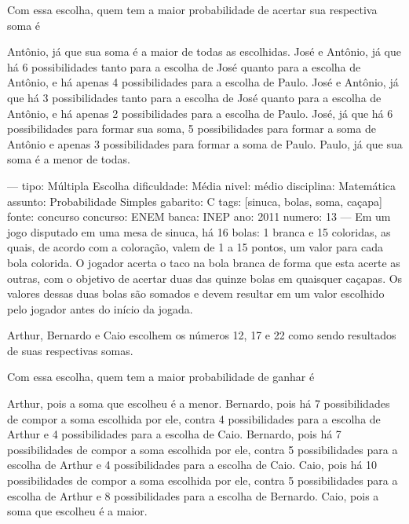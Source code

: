 Com essa escolha, quem tem a maior probabilidade de acertar sua respectiva soma é
\begin{choices}
\choice Antônio, já que sua soma é a maior de todas as escolhidas.
\choice José e Antônio, já que há 6 possibilidades tanto para a escolha de José quanto para a escolha de Antônio, e há apenas 4 possibilidades para a escolha de Paulo.
\choice José e Antônio, já que há 3 possibilidades tanto para a escolha de José quanto para a escolha de Antônio, e há apenas 2 possibilidades para a escolha de Paulo.
\correctchoice José, já que há 6 possibilidades para formar sua soma, 5 possibilidades para formar a soma de Antônio e apenas 3 possibilidades para formar a soma de Paulo.
\choice Paulo, já que sua soma é a menor de todas.
\end{choices}

---
tipo: Múltipla Escolha
dificuldade: Média
nivel: médio
disciplina: Matemática
assunto: Probabilidade Simples
gabarito: C
tags: [sinuca, bolas, soma, caçapa]
fonte: concurso
concurso: ENEM
banca: INEP
ano: 2011
numero: 13
---
\question
Em um jogo disputado em uma mesa de sinuca, há 16 bolas: 1 branca e 15 coloridas, as quais, de acordo com a coloração, valem de 1 a 15 pontos, um valor para cada bola colorida. O jogador acerta o taco na bola branca de forma que esta acerte as outras, com o objetivo de acertar duas das quinze bolas em quaisquer caçapas. Os valores dessas duas bolas são somados e devem resultar em um valor escolhido pelo jogador antes do início da jogada.

Arthur, Bernardo e Caio escolhem os números 12, 17 e 22 como sendo resultados de suas respectivas somas.

Com essa escolha, quem tem a maior probabilidade de ganhar é
\begin{choices}
\choice Arthur, pois a soma que escolheu é a menor.
\choice Bernardo, pois há 7 possibilidades de compor a soma escolhida por ele, contra 4 possibilidades para a escolha de Arthur e 4 possibilidades para a escolha de Caio.
\correctchoice Bernardo, pois há 7 possibilidades de compor a soma escolhida por ele, contra 5 possibilidades para a escolha de Arthur e 4 possibilidades para a escolha de Caio.
\choice Caio, pois há 10 possibilidades de compor a soma escolhida por ele, contra 5 possibilidades para a escolha de Arthur e 8 possibilidades para a escolha de Bernardo.
\choice Caio, pois a soma que escolheu é a maior.
\end{choices}

